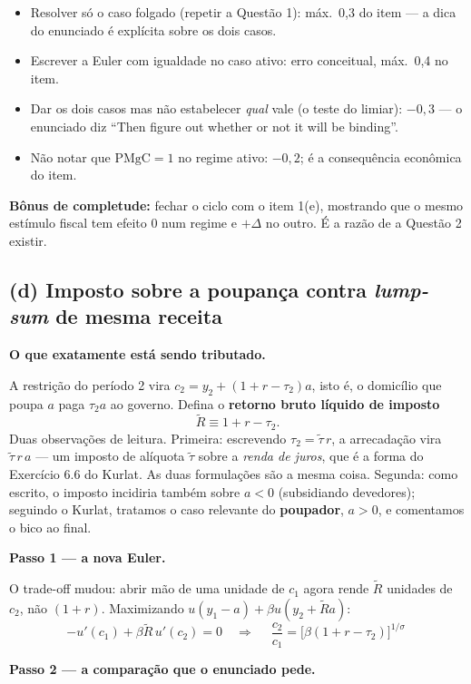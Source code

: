 \documentclass[11pt, a4paper]{article}
\newcommand{\passo}[1]{\medskip\noindent\textbf{#1}\par\nobreak}
\newcommand{\Rt}{\widetilde{R}}
\begin{document}
\begin{tcolorbox}[rubricbox]
\small
\begin{itemize}[topsep=2pt]
\item Resolver só o caso folgado (repetir a Questão 1): máx.\ 0,3 do item --- a dica do
      enunciado é explícita sobre os dois casos.
\item Escrever a Euler com igualdade no caso ativo: erro conceitual, máx.\ 0,4 no item.
\item Dar os dois casos mas não estabelecer \emph{qual} vale (o teste do limiar): $-0{,}3$
      --- o enunciado diz ``Then figure out whether or not it will be binding''.
\item Não notar que $\mathrm{PMgC}=1$ no regime ativo: $-0{,}2$; é a consequência
      econômica do item.
\end{itemize}
\textbf{Bônus de completude:} fechar o ciclo com o item 1(e), mostrando que o mesmo
estímulo fiscal tem efeito 0 num regime e $+\Delta$ no outro. É a razão de a Questão 2
existir.
\end{tcolorbox}

\subsection*{(d) Imposto sobre a poupança contra \emph{lump-sum} de mesma receita}

\passo{O que exatamente está sendo tributado.}
A restrição do período 2 vira $c_2 = y_2 + (1+r-\tau_2)a$, isto é, o domicílio que poupa
$a$ paga $\tau_2 a$ ao governo. Defina o \textbf{retorno bruto líquido de imposto}
$$\Rt \equiv 1+r-\tau_2 .$$
Duas observações de leitura. Primeira: escrevendo $\tau_2=\tilde\tau\,r$, a arrecadação
vira $\tilde\tau\,r\,a$ --- um imposto de alíquota $\tilde\tau$ sobre a \emph{renda de
juros}, que é a forma do Exercício 6.6 do Kurlat. As duas formulações são a mesma coisa.
Segunda: como escrito, o imposto incidiria também sobre $a<0$ (subsidiando devedores);
seguindo o Kurlat, tratamos o caso relevante do \textbf{poupador}, $a>0$, e comentamos o
bico ao final.

\passo{Passo 1 --- a nova Euler.}
O trade-off mudou: abrir mão de uma unidade de $c_1$ agora rende $\Rt$ unidades de $c_2$,
não $(1+r)$. Maximizando $u(y_1-a)+\beta u(y_2+\Rt a)$:
$$-u'(c_1)+\beta\Rt\,u'(c_2)=0
\quad\Longrightarrow\quad
\boxed{\;\frac{c_2}{c_1} = \big[\beta(1+r-\tau_2)\big]^{1/\sigma}\;}$$

\passo{Passo 2 --- a comparação que o enunciado pede.}
\end{document}

